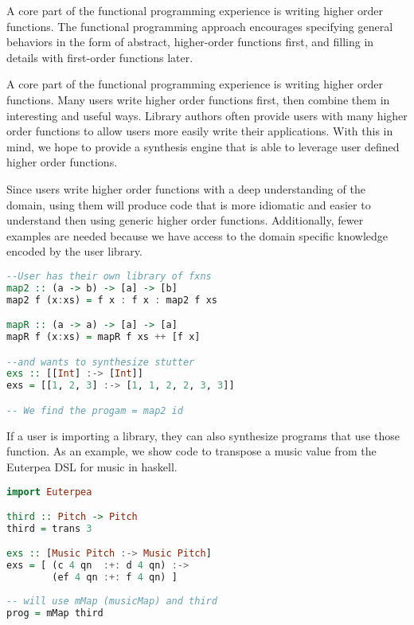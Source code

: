 A core part of the functional programming experience is writing higher order functions. The functional programming approach encourages specifying general behaviors in the form of abstract, higher-order functions first, and filling in details with first-order functions later.

A core part of the functional programming experience is writing higher order functions. Many users write higher order functions first, then combine them in interesting and useful ways. Library authors often provide users with many higher order functions to allow users more easily write their applications. With this in mind, we hope to provide a synthesis engine that is able to leverage user defined higher order functions.

Since users write higher order functions with a deep understanding of the domain, using them will produce code that is more idiomatic and easier to understand then using generic higher order functions. Additionally, fewer examples are needed because we have access to the domain specific knowledge encoded by the user library.

\begin{lstlisting}[language=haskell]
--User has their own library of fxns
map2 :: (a -> b) -> [a] -> [b]
map2 f (x:xs) = f x : f x : map2 f xs

mapR :: (a -> a) -> [a] -> [a]
mapR f (x:xs) = mapR f xs ++ [f x]

--and wants to synthesize stutter
exs :: [[Int] :-> [Int]]
exs = [[1, 2, 3] :-> [1, 1, 2, 2, 3, 3]]

-- We find the progam = map2 id
\end{lstlisting}


If a user is importing a library, they can also synthesize programs that use those function. As an example, we show code to transpose a music value from the Euterpea DSL for music in haskell.

\begin{lstlisting}[language=haskell]
import Euterpea

third :: Pitch -> Pitch
third = trans 3

exs :: [Music Pitch :-> Music Pitch]
exs = [ (c 4 qn  :+: d 4 qn) :->
        (ef 4 qn :+: f 4 qn) ]
        
-- will use mMap (musicMap) and third
prog = mMap third
\end{lstlisting}
